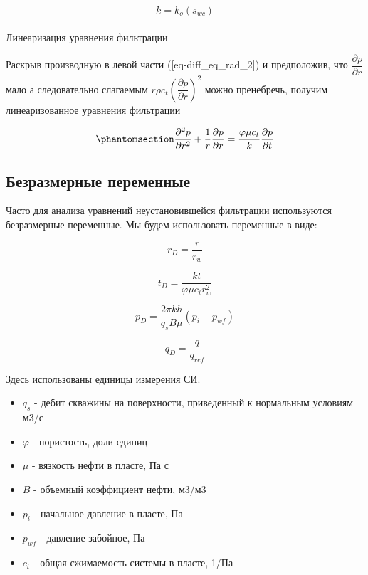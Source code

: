 \documentclass[
  russian,
  letterpaper,
  DIV=11,
  numbers=noendperiod,
  oneside]{scrartcl}
\makeatletter
\let\oldparagraph\paragraph
\renewcommand{\paragraph}{
    \@ifstar
      \xxxParagraphStar
      \xxxParagraphNoStar
  }
\newcommand{\xxxParagraphStar}[1]{\oldparagraph*{#1}\mbox{}}
\newcommand{\xxxParagraphNoStar}[1]{\oldparagraph{#1}\mbox{}}
\providecommand{\tightlist}{%
  \setlength{\itemsep}{0pt}\setlength{\parskip}{0pt}}
\makeatother
\begin{document}
\[ 
k= k_o (s_{wc}) 
\]

\paragraph{Линеаризация уравнения
фильтрации}\label{ux43bux438ux43dux435ux430ux440ux438ux437ux430ux446ux438ux44f-ux443ux440ux430ux432ux43dux435ux43dux438ux44f-ux444ux438ux43bux44cux442ux440ux430ux446ux438ux438}

Раскрыв производную в левой части (\ref{eq-diff_eq_rad_2}) и
предположив, что \(\dfrac{\partial p}{\partial r}\) мало а следовательно
слагаемым \(r \rho c_t \left( \dfrac{\partial p}{\partial r} \right)^2\)
можно пренебречь, получим линеаризованное уравнения фильтрации

\begin{equation}\phantomsection\label{eq-diff_eq_lin}{
\frac{\partial^2 p}{\partial r^2} + \frac{1}{r} \frac{\partial p}{\partial r}= \frac{\varphi \mu c_t}{k} \frac{\partial p}{\partial t}
}\end{equation}

\subsection{Безразмерные
переменные}\label{ux431ux435ux437ux440ux430ux437ux43cux435ux440ux43dux44bux435-ux43fux435ux440ux435ux43cux435ux43dux43dux44bux435}

Часто для анализа уравнений неустановившейся фильтрации используются
безразмерные переменные. Мы будем использовать переменные в виде:

\[ 
r_D = \frac{r}{r_w} 
\]

\[ 
t_D = \frac{kt}{\varphi \mu c_t r_w^2}
\]

\[ 
p_D = \frac{2 \pi kh}{q_s B \mu} \left( p_i - p_{wf} \right) 
\]

\[ 
q_D = \frac{q}{q_{ref}} 
\]

Здесь использованы единицы измерения СИ.

\begin{itemize}
\tightlist
\item
  \(q_s\) - дебит скважины на поверхности, приведенный к нормальным
  условиям м3/с
\item
  \(\varphi\) - пористость, доли единиц
\item
  \(\mu\) - вязкость нефти в пласте, Па с
\item
  \(B\) - объемный коэффициент нефти, м3/м3
\item
  \(p_i\) - начальное давление в пласте, Па
\item
  \(p_{wf}\) - давление забойное, Па
\item
  \(c_t\) - общая сжимаемость системы в пласте, 1/Па
\end{itemize}
\end{document}
